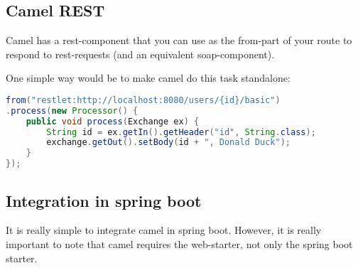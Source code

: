 \subsection{Camel REST}
Camel has a rest-component that you can use as the from-part of your route to respond to rest-requests (and an equivalent soap-component).

One simple way would be to make camel do this task standalone: 

\begin{lstlisting}[language=java]
from("restlet:http://localhost:8080/users/{id}/basic")
.process(new Processor() {
    public void process(Exchange ex) {
        String id = ex.getIn().getHeader("id", String.class);
        exchange.getOut().setBody(id + ", Donald Duck");
    }
});
\end{lstlisting}


\subsection{Integration in spring boot}
It is really simple to integrate camel in spring boot. 
However, it is really important to note that camel requires the web-starter, not only the spring boot starter. 

